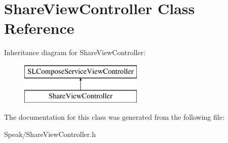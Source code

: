 \hypertarget{interface_share_view_controller}{}\section{Share\+View\+Controller Class Reference}
\label{interface_share_view_controller}
Inheritance diagram for Share\+View\+Controller\+:\begin{figure}[H]
\begin{center}
\leavevmode
\includegraphics[height=2.000000cm]{interface_share_view_controller}
\end{center}
\end{figure}


The documentation for this class was generated from the following file\+:\begin{DoxyCompactItemize}
\item 
Speak/Share\+View\+Controller.\+h\end{DoxyCompactItemize}
